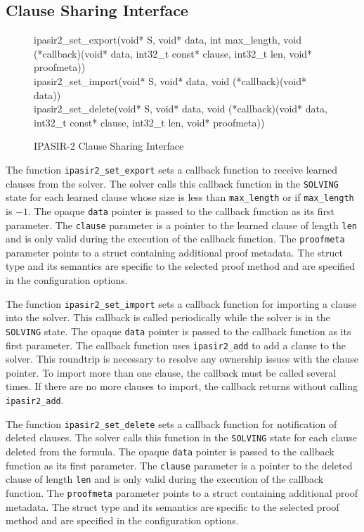\documentclass[sat]{iosart2x}
\begin{document}
\subsection{Clause Sharing Interface}

\begin{figure}[t]
\tt\raggedright
ipasir2\_set\_export(void* S, void* data, int max\_length, void (*callback)(void* data, int32\_t const* clause, int32\_t len, void* proofmeta))\\
ipasir2\_set\_import(void* S, void* data, void (*callback)(void* data))\\
ipasir2\_set\_delete(void* S, void* data, void (*callback)(void* data, int32\_t const* clause, int32\_t len, void* proofmeta))
\caption{IPASIR-2 Clause Sharing Interface}
\end{figure}

The function \texttt{ipasir2\_set\_export} sets a callback function to receive learned clauses from the solver.
The solver calls this callback function in the \texttt{SOLVING} state for each learned clause whose size is less than \texttt{max\_length} or if \texttt{max\_length} is $-1$.
The opaque \texttt{data} pointer is passed to the callback function as its first parameter.
The \texttt{clause} parameter is a pointer to the learned clause of length \texttt{len} and is only valid during the execution of the callback function.
The \texttt{proofmeta} parameter points to a struct containing additional proof metadata.
The struct type and its semantics are specific to the selected proof method and are specified in the configuration options.

The function \texttt{ipasir2\_set\_import} sets a callback function for importing a clause into the solver.
This callback is called periodically while the solver is in the \texttt{SOLVING} state.
The opaque \texttt{data} pointer is passed to the callback function as its first parameter.
The callback function uses \texttt{ipasir2\_add} to add a clause to the solver.
This roundtrip is necessary to resolve any ownership issues with the clause pointer.
To import more than one clause, the callback must be called several times.
If there are no more clauses to import, the callback returns without calling \texttt{ipasir2\_add}.

The function \texttt{ipasir2\_set\_delete} sets a callback function for notification of deleted clauses.
The solver calls this function in the \texttt{SOLVING} state for each clause deleted from the formula.
The opaque \texttt{data} pointer is passed to the callback function as its first parameter.
The \texttt{clause} parameter is a pointer to the deleted clause of length \texttt{len} and is only valid during the execution of the callback function.
The \texttt{proofmeta} parameter points to a struct containing additional proof metadata.
The struct type and its semantics are specific to the selected proof method and are specified in the configuration options.
\end{document}
